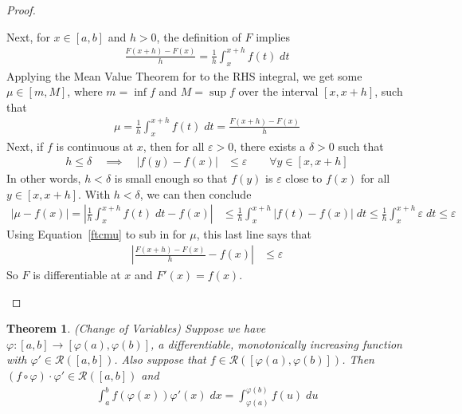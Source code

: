 \documentclass[12pt]{article}
\numberwithin{equation}{section} %
\theoremstyle{plain}
\newtheorem{thm}{Theorem}[section]
\theoremstyle{definition}
\theoremstyle{remark}
\begin{document}
\begin{proof}
\begin{enumerate}[label=\Roman*.]
    Next, for $x\in[a,b]$ and $h>0$, the definition of $F$ implies
    \begin{align*}
      \frac{F(x+h)-F(x)}{h} = \frac{1}{h}\int^{x+h}_x f(t)\;dt
    \end{align*}
    Applying the Mean Value Theorem for to the RHS integral, we
    get some $\mu \in [m, M]$, where $m = \inf f$ and $M = \sup f$ over
    the interval $[x,x+h]$, such that
    \begin{align}
      \mu = \frac{1}{h}\int^{x+h}_x f(t)\;dt
      = \frac{F(x+h)-F(x)}{h}
      \label{ftcmu}
    \end{align}
    Next, if $f$ is continuous at $x$, then for all $\varepsilon>0$,
    there exists a $\delta>0$ such that
    \begin{align}
        h \leq \delta \quad \implies \quad |f(y) - f(x)|
        &\leq\varepsilon
        \qquad \forall y\in[x,x+h]
    \end{align}
    In other words, $h<\delta$ is small enough so that $f(y)$ is
    $\varepsilon$ close to $f(x)$ for all $y\in[x,x+h]$.
    With $h<\delta$, we can then conclude
    \begin{align*}
      \left\lvert
      \mu - f(x)
      \right\rvert
      =
      \left\lvert
      \frac{1}{h}\int^{x+h}_x f(t)\;dt
      - f(x)
      \right\rvert
      &\leq
      \frac{1}{h}\int^{x+h}_x\big|f(t)-f(x)\big|\;dt
      \leq
      \frac{1}{h}\int^{x+h}_x\varepsilon\;dt
      \leq\varepsilon
    \end{align*}
    Using Equation~\ref{ftcmu} to sub in for $\mu$, this last line says
    that
    \begin{align*}
      \left\lvert \frac{F(x+h)-F(x)}{h}- f(x)
      \right\rvert
      &\leq\varepsilon
    \end{align*}
    So $F$ is differentiable at $x$ and $F'(x)=f(x)$.
\end{enumerate}
\end{proof}

\clearpage
\begin{thm}\emph{(Change of Variables)}
Suppose we have $\varphi: [a,b] \rightarrow [\varphi(a), \varphi(b)]$, a
differentiable, monotonically increasing function with
$\varphi'\in\mathscr{R}([a,b])$. Also suppose that
$f\in\mathscr{R}([\varphi(a),\varphi(b)])$. Then $(f\circ
\varphi)\cdot\varphi' \in \mathscr{R}([a,b])$ and
\begin{align*}
  \int^b_a f\left(\varphi(x)\right) \varphi'(x)\;dx
  = \int^{\varphi(b)}_{\varphi(a)} f(u)\;du
\end{align*}
\end{thm}
\end{document}
